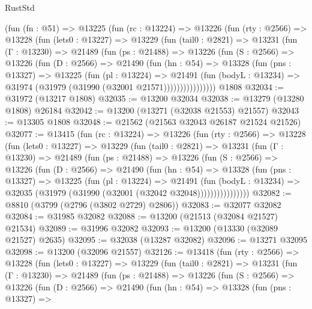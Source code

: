 \begin{lexlean}{RustStd}
\begin{coremodule}
    (fun (fn : @51) =>
    @13225
      (fun (rc : @13224) =>
      @13226
        (fun (rty : @2566) =>
        @13228
          (fun (lets0 : @13227) =>
          @13229
            (fun (tail0 : @2821) =>
            @13231
              (fun (Γ : @13230) =>
              @21489
                (fun (ps : @21488) =>
                @13226
                  (fun (S : @2566) =>
                  @13226
                    (fun (D : @2566) =>
                    @21490
                      (fun (hn : @54) =>
                      @13328
                        (fun (pns : @13327) =>
                        @13225
                          (fun (pl : @13224) =>
                          @21491
                            (fun (bodyL : @13234) =>
                            @31974 (@31979 (@31990 (@32001 @21571))))))))))))))))
    @1808
@32034 := @31972 (@13217 @1808)
@32035 := @13200 @32034
@32038 := @13279 (@13280 @1808) @26184
@32042 := @13200 (@13271 (@32038 @21553) @21557)
@32043 := @13305 @1808
@32048 := @21562 (@21563 @32043 @26187 @21524 @21526)
@32077 := @13415
    (fun (rc : @13224) =>
    @13226
      (fun (rty : @2566) =>
      @13228
        (fun (lets0 : @13227) =>
        @13229
          (fun (tail0 : @2821) =>
          @13231
            (fun (Γ : @13230) =>
            @21489
              (fun (ps : @21488) =>
              @13226
                (fun (S : @2566) =>
                @13226
                  (fun (D : @2566) =>
                  @21490
                    (fun (hn : @54) =>
                    @13328
                      (fun (pns : @13327) =>
                      @13225
                        (fun (pl : @13224) =>
                        @21491
                          (fun (bodyL : @13234) =>
                          @32035 (@31979 (@31990 (@32001 (@32042 @32048))))))))))))))))
@32082 := @8810 (@3799 (@2796 (@3802 @2729) @2806))
@32083 := @32077 @32082
@32084 := @31985 @32082
@32088 := @13200 (@21513 (@32084 @21527) @21534)
@32089 := @31996 @32082
@32093 := @13200 (@13330 (@32089 @21527) @2635)
@32095 := @32038 (@13287 @32082)
@32096 := @13271 @32095
@32098 := @13200 (@32096 @21557)
@32126 := @13418
    (fun (rty : @2566) =>
    @13228
      (fun (lets0 : @13227) =>
      @13229
        (fun (tail0 : @2821) =>
        @13231
          (fun (Γ : @13230) =>
          @21489
            (fun (ps : @21488) =>
            @13226
              (fun (S : @2566) =>
              @13226
                (fun (D : @2566) =>
                @21490
                  (fun (hn : @54) =>
                  @13328
                    (fun (pns : @13327) =>

\end{coremodule}
\end{lexlean}
